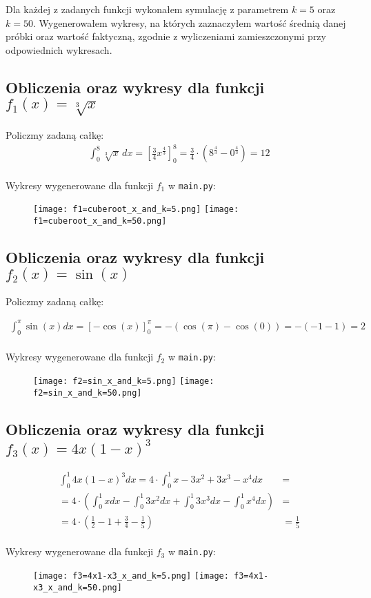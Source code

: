 \documentclass{article}
\begin{document}
Dla każdej z zadanych funkcji wykonałem symulację z parametrem $k=5$ oraz $k=50$. Wygenerowałem wykresy, na których zaznaczyłem wartość średnią danej próbki oraz wartość faktyczną, zgodnie z wyliczeniami zamieszczonymi przy odpowiednich wykresach.

\subsection{Obliczenia oraz wykresy dla funkcji \(f_1(x)=\sqrt[3]{x}\)}
Policzmy zadaną całkę:
\begin{align}
\int_{0}^{8} \sqrt[3]{x}\, dx = \left[\frac{3}{4}x^{\frac{4}{3}} \right]_{0}^{8} = \frac{3}{4} \cdot \left(8^{\frac{4}{3}} - 0^{\frac{4}{3}}\right) = 12
\end{align}
\\
Wykresy wygenerowane dla funkcji $f_1$ w \texttt{main.py}:
\begin{figure}[H]
    \texttt{[image: f1=cuberoot\_x\_and\_k=5.png]}
    \texttt{[image: f1=cuberoot\_x\_and\_k=50.png]}
\end{figure}

\subsection{Obliczenia oraz wykresy dla funkcji \(f_2(x)=\sin(x)\)}

Policzmy zadaną całkę:

\begin{align}
\int_{0}^{\pi} \sin(x) dx = \left[- \cos(x) \right]_{0}^{\pi} = - (\cos(\pi) - \cos(0)) = - (-1 - 1) = 2
\end{align}
\\
Wykresy wygenerowane dla funkcji $f_2$ w \texttt{main.py}:
\begin{figure}[H]
    \texttt{[image: f2=sin\_x\_and\_k=5.png]}
    \texttt{[image: f2=sin\_x\_and\_k=50.png]}
\end{figure}
 
\subsection{Obliczenia oraz wykresy dla funkcji \(f_3(x)=4x(1-x)^3\)}

\begin{align}
    \int_{0}^{1} 4x(1-x)^3 dx = 4 \cdot \int_{0}^{1} x - 3x^2 + 3x^3 - x^4 dx &=\\
    = 4\cdot \left(\int_{0}^{1} x dx - \int_{0}^{1} 3x^2 dx + \int_{0}^{1} 3x^3 dx - \int_{0}^{1} x^4 dx \right) &=\\
    = 4\cdot\left(\frac{1}{2} - 1 + \frac{3}{4} - \frac{1}{5}\right) &= \frac{1}{5}
\end{align}
\\
Wykresy wygenerowane dla funkcji $f_3$ w \texttt{main.py}:
\begin{figure}[H]
    \texttt{[image: f3=4x1-x3\_x\_and\_k=5.png]}
    \texttt{[image: f3=4x1-x3\_x\_and\_k=50.png]}
\end{figure}
 
\end{document}
